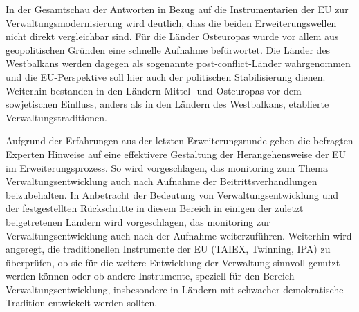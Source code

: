 In der Gesamtschau der Antworten in Bezug auf die Instrumentarien der EU zur Verwaltungsmodernisierung wird deutlich, dass die beiden Erweiterungswellen nicht direkt vergleichbar sind. Für die Länder Osteuropas wurde vor allem aus geopolitischen Gründen eine schnelle Aufnahme befürwortet. Die Länder des Westbalkans werden dagegen als sogenannte post-conflict-Länder wahrgenommen und die EU-Perspektive soll hier auch der politischen Stabilisierung dienen. Weiterhin bestanden in den Ländern Mittel- und Osteuropas vor dem sowjetischen Einfluss, anders als in den Ländern des Westbalkans, etablierte Verwaltungstraditionen.\par
Aufgrund der Erfahrungen aus der letzten Erweiterungsrunde geben die befragten Experten Hinweise auf eine effektivere Gestaltung der Herangehensweise der EU im Erweiterungsprozess. So wird vorgeschlagen, das monitoring zum Thema Verwaltungsentwicklung auch nach Aufnahme der Beitrittsverhandlungen beizubehalten. In Anbetracht der Bedeutung von Verwaltungsentwicklung und der festgestellten Rückschritte in diesem Bereich in einigen der zuletzt beigetretenen Ländern wird vorgeschlagen, das monitoring zur Verwaltungsentwicklung auch nach der Aufnahme weiterzuführen. Weiterhin wird angeregt, die traditionellen Instrumente der EU (TAIEX, Twinning, IPA) zu überprüfen, ob sie für die weitere Entwicklung der Verwaltung sinnvoll genutzt werden können oder ob andere Instrumente, speziell für den Bereich Verwaltungsentwicklung, insbesondere in Ländern mit schwacher demokratische Tradition entwickelt werden sollten.
